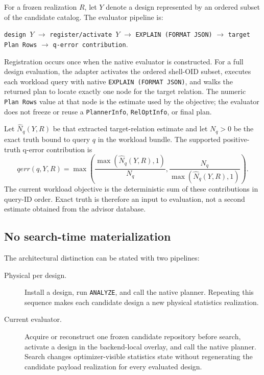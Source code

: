 For a frozen realization $R$, let $Y$ denote a design represented by an
ordered subset of the candidate catalog.  The evaluator pipeline is:

\begin{center}
\texttt{design $Y$}
\;$\rightarrow$\;
\texttt{register/activate $Y$}
\;$\rightarrow$\;
\texttt{EXPLAIN (FORMAT JSON)}
\;$\rightarrow$\;
\texttt{target Plan Rows}
\;$\rightarrow$\;
\texttt{q-error contribution}.
\end{center}

Registration occurs once when the native evaluator is constructed.  For a
full design evaluation, the adapter activates the ordered shell-OID subset,
executes each workload query with native \texttt{EXPLAIN (FORMAT JSON)}, and
walks the returned plan to locate exactly one node for the target relation.
The numeric \texttt{Plan Rows} value at that node is the estimate used by the
objective; the evaluator does not freeze or reuse a \texttt{PlannerInfo},
\texttt{RelOptInfo}, or final plan.

Let $\widehat{N}_q(Y,R)$ be that extracted target-relation estimate and let
$N_q>0$ be the exact truth bound to query $q$ in the workload bundle.  The
supported positive-truth q-error contribution is
\[
 qerr(q,Y,R)=\max\left(\frac{\max(\widehat{N}_q(Y,R),1)}{N_q},
                         \frac{N_q}{\max(\widehat{N}_q(Y,R),1)}\right).
\]
The current workload objective is the deterministic sum of these contributions
in query-ID order.  Exact truth is therefore an input to evaluation, not a
second estimate obtained from the advisor database.

\subsection{No search-time materialization}

The architectural distinction can be stated with two pipelines:

\begin{description}
\item[Physical per design.] Install a design, run \texttt{ANALYZE}, and call
the native planner.  Repeating this sequence makes each candidate design a
new physical statistics realization.
\item[Current evaluator.] Acquire or reconstruct one frozen candidate
repository before search, activate a design in the backend-local overlay, and
call the native planner.  Search changes optimizer-visible statistics state
without regenerating the candidate payload realization for every evaluated
design.
\end{description}

